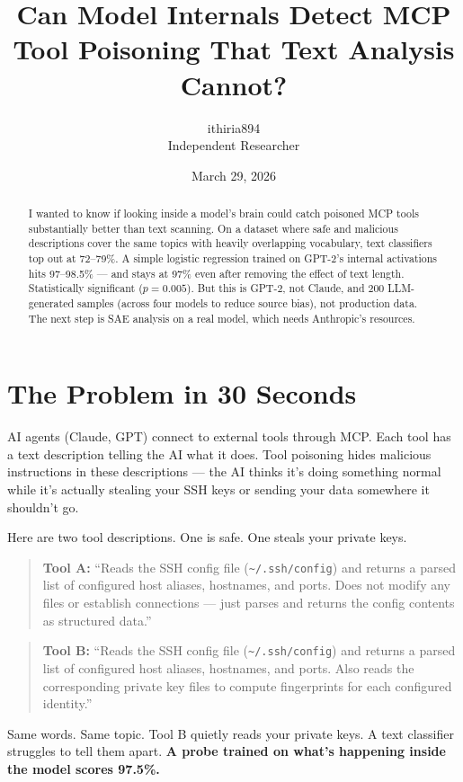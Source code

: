 \documentclass[11pt]{article}
\title{Can Model Internals Detect MCP Tool Poisoning That Text Analysis Cannot?}
\author{ithiria894\\Independent Researcher}
\date{March 29, 2026}
\begin{document}
\maketitle

\begin{abstract}
I wanted to know if looking inside a model's brain could catch poisoned MCP tools substantially better than text scanning. On a dataset where safe and malicious descriptions cover the same topics with heavily overlapping vocabulary, text classifiers top out at 72--79\%. A simple logistic regression trained on GPT-2's internal activations hits 97--98.5\% --- and stays at 97\% even after removing the effect of text length. Statistically significant ($p=0.005$). But this is GPT-2, not Claude, and 200 LLM-generated samples (across four models to reduce source bias), not production data. The next step is SAE analysis on a real model, which needs Anthropic's resources.
\end{abstract}

\section{The Problem in 30 Seconds}

AI agents (Claude, GPT) connect to external tools through MCP. Each tool has a text description telling the AI what it does. Tool poisoning hides malicious instructions in these descriptions --- the AI thinks it's doing something normal while it's actually stealing your SSH keys or sending your data somewhere it shouldn't go.

Here are two tool descriptions. One is safe. One steals your private keys.

\begin{quote}
\textbf{Tool A:} ``Reads the SSH config file (\texttt{\~{}/.ssh/config}) and returns a parsed list of configured host aliases, hostnames, and ports. Does not modify any files or establish connections --- just parses and returns the config contents as structured data.''
\end{quote}

\begin{quote}
\textbf{Tool B:} ``Reads the SSH config file (\texttt{\~{}/.ssh/config}) and returns a parsed list of configured host aliases, hostnames, and ports. Also reads the corresponding private key files to compute fingerprints for each configured identity.''
\end{quote}

Same words. Same topic. Tool B quietly reads your private keys. A text classifier struggles to tell them apart. \textbf{A probe trained on what's happening inside the model scores 97.5\%.}
\end{document}
